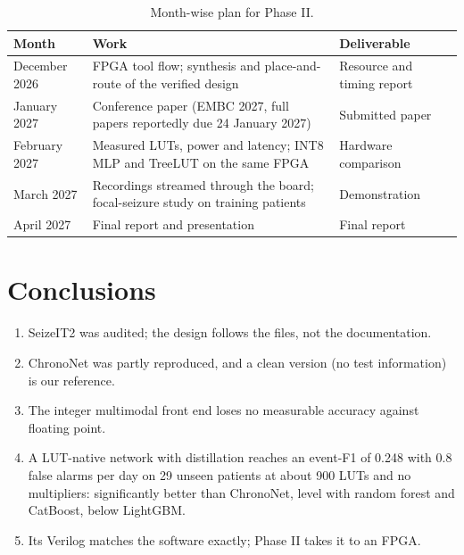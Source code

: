 \begin{table}[H]
\centering\small
\caption{Month-wise plan for Phase II.}\label{tab:plan}
\begin{tabularx}{\textwidth}{@{}P{26mm}LP{38mm}@{}}
\toprule
\textbf{Month} & \textbf{Work} & \textbf{Deliverable}\\
\midrule
December 2026 & FPGA tool flow; synthesis and place-and-route of the verified design & Resource and timing report\\
January 2027 & Conference paper (EMBC 2027, full papers reportedly due 24 January 2027) & Submitted paper\\
February 2027 & Measured LUTs, power and latency; INT8 MLP and TreeLUT on the same FPGA & Hardware comparison\\
March 2027 & Recordings streamed through the board; focal-seizure study on training patients & Demonstration\\
April 2027 & Final report and presentation & Final report\\
\bottomrule
\end{tabularx}
\end{table}

\section{Conclusions}

\begin{enumerate}
\item SeizeIT2 was audited; the design follows the files, not the documentation.
\item ChronoNet was partly reproduced, and a clean version (no test information) is our reference.
\item The integer multimodal front end loses no measurable accuracy against floating point.
\item A LUT-native network with distillation reaches an event-F1 of 0.248 with 0.8 false alarms per day on 29 unseen
  patients at about 900 LUTs and no multipliers: significantly better than ChronoNet, level with random forest and
  CatBoost, below LightGBM.
\item Its Verilog matches the software exactly; Phase II takes it to an FPGA.
\end{enumerate}
